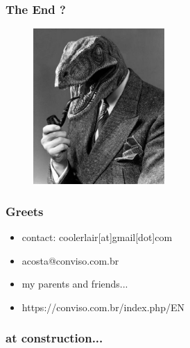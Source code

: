 \documentclass[serif,mathserif]{beamer}
\begin{document}
\begin{frame}
  \frametitle{The End ?}
  \begin{figure}[]    
    \centering
    \includegraphics[width=5cm]{images/raptor0.jpg} 
  \end{figure}
\end{frame}




\begin{frame}
  \frametitle{Greets}
  \begin{itemize}
  \item contact: coolerlair[at]gmail[dot]com 
  \item acosta@conviso.com.br
  \item my parents and friends...
  \item https://conviso.com.br/index.php/EN
  \end{itemize}
\end{frame}

\begin{frame}
  \frametitle{at construction...}
\end{frame}
\end{document}
